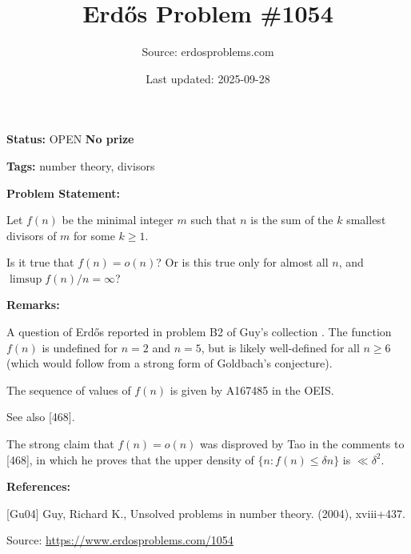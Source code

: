 \documentclass{article}
\title{Erd\H{o}s Problem \#1054}
\date{Last updated: 2025-09-28}
\author{Source: erdosproblems.com}
\begin{document}
\maketitle

\noindent\textbf{Status:} OPEN \quad \textbf{No prize}

\noindent\textbf{Tags:} number theory, divisors

\medskip
\noindent\textbf{Problem Statement:}

Let $f(n)$ be the minimal integer $m$ such that $n$ is the sum of the $k$ smallest divisors of $m$ for some $k\geq 1$.

Is it true that $f(n)=o(n)$? Or is this true only for almost all $n$, and $\limsup f(n)/n=\infty$?

\bigskip
\noindent\textbf{Remarks:}

A question of Erd\H{o}s reported in problem B2 of Guy's collection \cite{Gu04}. The function $f(n)$ is undefined for $n=2$ and $n=5$, but is likely well-defined for all $n\geq 6$ (which would follow from a strong form of Goldbach's conjecture).

The sequence of values of $f(n)$ is given by A167485 in the OEIS.

See also [468].

The strong claim that $f(n)=o(n)$ was disproved by Tao in the comments to [468], in which he proves that the upper density of $\{ n : f(n)\leq \delta n\}$ is $\ll \delta^2$.

\bigskip
\noindent\textbf{References:}

[Gu04] Guy, Richard K., Unsolved problems in number theory. (2004), xviii+437.

\bigskip
\noindent\small{Source: \url{https://www.erdosproblems.com/1054}}
\end{document}

